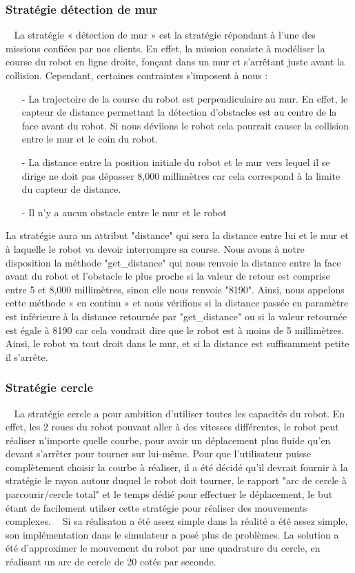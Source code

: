 \documentclass[12pt]{article}
\def\tab{$\>\>\>\>$}
\begin{document}
\subsubsection{Stratégie détection de mur}
\tab La stratégie « détection de mur » est la stratégie répondant à l’une des missions confiées par nos clients. En effet, la mission consiste à modéliser la course du robot en ligne droite, fonçant dans un mur et s’arrêtant juste avant la collision.
Cependant, certaines contraintes s’imposent à nous : \begin{itemize}
\item[-] La trajectoire de la course du robot est perpendiculaire au mur. En effet, le capteur de distance permettant la détection d’obstacles est au centre de la face avant du robot. Si nous déviions le robot cela pourrait causer la collision entre le mur et le coin du robot.
\item[-] La distance entre la position initiale du robot et le mur vers lequel il se dirige ne doit pas dépasser 8,000 millimètres car cela correspond à la limite du capteur de distance.
\item[-] Il n’y a aucun obstacle entre le mur et le robot
\end{itemize}
La stratégie aura un attribut "distance" qui sera la distance entre lui et le mur et à laquelle le robot va devoir interrompre sa course.
Nous avons à notre disposition la méthode "get\_distance" qui nous renvoie la distance entre la face avant du robot et l’obstacle le plus proche si la valeur de retour est comprise entre 5 et 8,000 millimètres, sinon elle nous renvoie "8190". Ainsi, nous appelons cette méthode « en continu » et nous vérifions si la distance passée en paramètre est inférieure à la distance retournée par "get\_distance" ou si la valeur retournée est égale à 8190 car cela voudrait dire que le robot est à moins de 5 millimètres.
Ainsi, le robot va tout droit dans le mur, et si la distance est suffisamment petite il s’arrête.

\subsubsection{Stratégie cercle}
\tab La stratégie cercle a pour ambition d'utiliser toutes les capacités du robot. En effet, les 2 roues du robot pouvant aller à des vitesses différentes, le robot peut réaliser n'importe quelle courbe, pour avoir un déplacement plus fluide qu'en devant s'arrêter pour tourner sur lui-même. Pour que l'utilisateur puisse complètement choisir la courbe à réaliser, il a été décidé qu'il devrait fournir à la stratégie le rayon autour duquel le robot doit tourner, le rapport "arc de cercle à parcourir/cercle total" et le temps dédié pour effectuer le déplacement, le but étant de facilement utilser cette stratégie pour réaliser des mouvements complexes.
\tab Si sa réalisaton a été assez simple dans la réalité a été assez simple, son implémentation dans le simulateur a posé plus de problèmes. La solution a été d'approximer le mouvement du robot par une quadrature du cercle, en réalisant un arc de cercle de 20 cotés par seconde.
\end{document}

